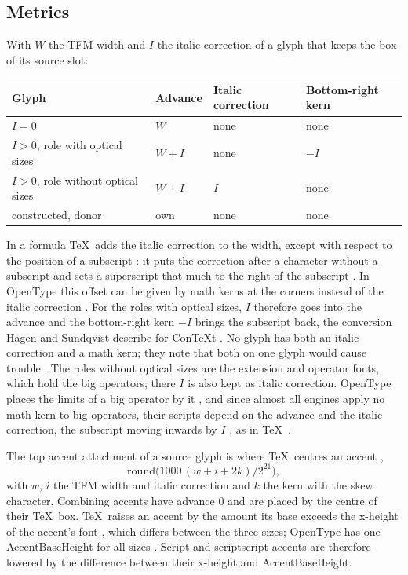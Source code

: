\documentclass[10pt]{article}
\begin{document}
\subsection{Metrics}\label{sec:metrics}

With $W$ the TFM width and $I$ the italic correction of a glyph that
keeps the box of its source slot:

\begin{center}
\begin{tabular}{llll}
\toprule
Glyph & Advance & Italic correction & Bottom-right kern \\
\midrule
$I = 0$ & $W$ & none & none \\
$I > 0$, role with optical sizes & $W + I$ & none & $-I$ \\
$I > 0$, role without optical sizes & $W + I$ & $I$ & none \\
constructed, donor & own & none & none \\
\bottomrule
\end{tabular}
\end{center}

In a formula \TeX\ adds the italic correction to the width, except
with respect to the position of a subscript \cite[\S543]{tex-program}:
it puts the correction after a character without a subscript
\cite[\S755]{tex-program} and sets a superscript that much to the right
of the subscript \cite[\S756]{tex-program}.  In OpenType this offset
can be given by math kerns at the corners instead of the italic
correction \cite[p.~20]{vieth}.  For the roles with optical sizes, $I$
therefore goes into the advance and the bottom-right kern $-I$ brings
the subscript back, the conversion Hagen and Sundqvist describe for
ConTeXt \cite[\S4.2]{hagen-sundqvist}.  No glyph has both an italic
correction and a math kern; they note that both on one glyph would
cause trouble \cite[\S4]{hagen-sundqvist}.  The roles without optical
sizes are the extension and operator fonts, which hold the big
operators; there $I$ is also kept as italic correction.  OpenType
places the limits of a big operator by it \cite{opentype-math}, and
since almost all engines apply no math kern to big operators, their
scripts depend on the advance and the italic correction, the subscript
moving inwards by $I$ \cite{noto-math}, as in \TeX\
\cite[\S\S749--750]{tex-program}.

The top accent attachment of a source glyph is where \TeX\ centres an
accent \cite[\S738]{tex-program},
\[
  \mathrm{round}\bigl(1000\,(w + i + 2k)/2^{21}\bigr),
\]
with $w$, $i$ the TFM width and italic correction and $k$ the kern with
the skew character.  Combining accents have advance 0 and are placed by
the centre of their \TeX\ box.  \TeX\ raises an accent by the amount
its base exceeds the x-height of the accent's font
\cite[\S738]{tex-program}, which differs between the three sizes;
OpenType has one AccentBaseHeight for all sizes \cite{opentype-math}.
Script and scriptscript accents are therefore lowered by the difference
between their x-height and AccentBaseHeight.
\end{document}
